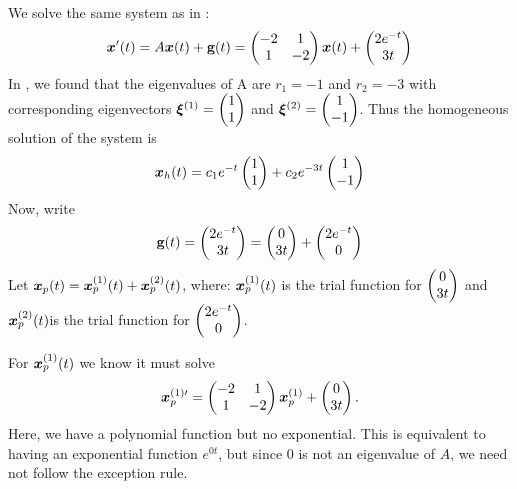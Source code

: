 \begin{eg}\label{eg:nonhom2}
	We solve the same system as in :
	\[ 
	\bm{x}'(t) = A\bm{x}(t) + \textbf{g}(t) = \begin{pmatrix}-2&1\\1&-2\end{pmatrix} \bm{x}(t) + \begin{pmatrix}2e^{-t}\\3t\end{pmatrix}
	\]
	In , we found that the eigenvalues of A are $r_1 = -1$ and $r_2 = -3$ with corresponding eigenvectors $\bm{\xi}^{(1)} = \begin{pmatrix}1 \\ 1\end{pmatrix}$ and $\bm{\xi}^{(2)} = \begin{pmatrix}1 \\ -1\end{pmatrix}$. Thus the homogeneous solution of the system is
	\[
	\bm{x}_h(t) = c_1e^{-t} \begin{pmatrix}1\\1\end{pmatrix} + c_2e^{-3t} \begin{pmatrix}1\\-1\end{pmatrix}
	\]
	Now, write
	\begin{equation}
		\textbf{g}(t) = \begin{pmatrix}2e^{-t}\\3t\end{pmatrix} = \begin{pmatrix}0\\3t\end{pmatrix} +\begin{pmatrix}2e^{-t}\\0\end{pmatrix}
	\end{equation}
	Let $\bm{x}_p(t) = \bm{x}_p^{(1)}(t) + \bm{x}_p^{(2)}(t)$, where: $\bm{x}_p^{(1)}(t)$ is the trial function for $\begin{pmatrix}0\\3t\end{pmatrix}$ and $\bm{x}_p^{(2)}(t)$is the trial function for $\begin{pmatrix}2e^{-t}\\0\end{pmatrix}$.
	
	For $\bm{x}_p^{(1)}(t)$ we know it must solve
	\[
	\bm{x}_p^{(1)\prime} = \begin{pmatrix}-2&1\\1&-2\end{pmatrix}\bm{x}_p^{(1)} + \begin{pmatrix}0\\3t\end{pmatrix}.
	\]
	Here, we have a polynomial function but no exponential. This is equivalent to having an exponential function $e^{0t}$, but since 0 is not an eigenvalue of $A$, we need not follow the exception rule.
	

\end{eg}

